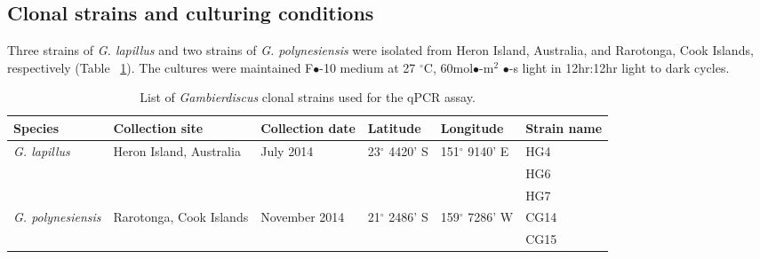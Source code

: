 \documentclass[12pt]{article}
\begin{document}
\subsection{Clonal strains and culturing conditions}
Three strains of \emph{G. lapillus} and two strains of \emph{G. polynesiensis} were isolated from Heron Island, Australia, and Rarotonga, Cook Islands, respectively (Table ~\ref{tbl:StrainTable}). The cultures were maintained F$\bullet$-10 medium at 27 $^{\circ}$C, 60mol$\bullet$-m$^{2}$ $\bullet$-s light in 12hr:12hr light to dark cycles.
\FloatBarrier
\begin{table}
\caption{List of \emph{Gambierdiscus} clonal strains used for the qPCR assay.}
\label{tbl:StrainTable}
\begin{tabular}{ | p{2cm} | p{2cm} | p{2cm}| p{3cm} | p{3cm} | p{2cm} | }
\hline
\textbf{Species} & \textbf{Collection site} & \textbf{Collection date} &\textbf{Latitude} & \textbf{Longitude} & \textbf{Strain name} \\
\hline
\emph{G. lapillus} &Heron Island, Australia &July 2014 &23$^{\circ}$ 4420' S&151$^{\circ}$ 9140' E & HG4 \\
\hline
&&&&& HG6\\
\hline
&&&& &HG7\\
\hline
\emph{G. polynesiensis}&Rarotonga, Cook Islands&November 2014 &21$^{\circ}$ 2486' S&159$^{\circ}$ 7286' W & CG14 \\
\hline
&&&&&CG15\\
\hline
\end{tabular}
\end{table}
\end{document}
